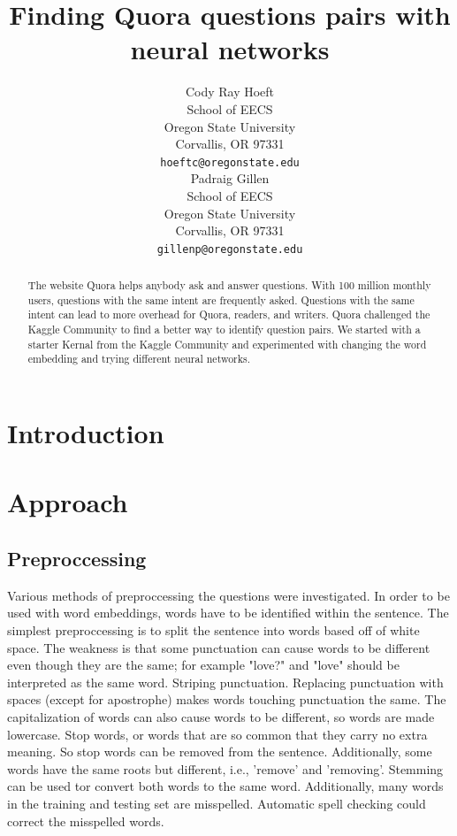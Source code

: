 \documentclass{article}
\title{Finding Quora questions pairs with neural networks}
\author{
    Cody Ray Hoeft \\
    School of EECS \\
    Oregon State University \\
    Corvallis, OR 97331 \\
    \texttt{hoeftc@oregonstate.edu} \\
    \And
    Padraig Gillen \\
    School of EECS \\
    Oregon State University \\
    Corvallis, OR 97331 \\
    \texttt{gillenp@oregonstate.edu} \\
}
\begin{document}

\maketitle

\begin{abstract}
    The website Quora helps anybody ask and answer questions. With 100 million monthly users, questions with the same intent are frequently asked. Questions with the same intent can lead to more overhead for Quora, readers, and writers. Quora challenged the Kaggle Community to find a better way to identify question pairs. We started with a starter Kernal from the Kaggle Community and experimented with changing the word embedding and trying different neural networks.
\end{abstract}

\section{Introduction}

\section{Approach}

\subsection{Preproccessing}

Various methods of preproccessing the questions were investigated. In order to be used with word embeddings, words have to be identified within the sentence. The simplest preproccessing is to split the sentence into words based off of white space. The weakness is that some punctuation can cause words to be different even though they are the same; for example "love?" and "love" should be interpreted as the same word. Striping punctuation. Replacing punctuation with spaces (except for apostrophe) makes words touching punctuation the same. The capitalization of words can also cause words to be different, so words are made lowercase. Stop words, or words that are so common that they carry no extra meaning. So stop words can be removed from the sentence. Additionally, some words have the same roots but different, i.e., 'remove' and 'removing'. Stemming can be used tor convert both words to the same word. Additionally, many words in the training and testing set are misspelled. Automatic spell checking could correct the misspelled words.
\end{document}
